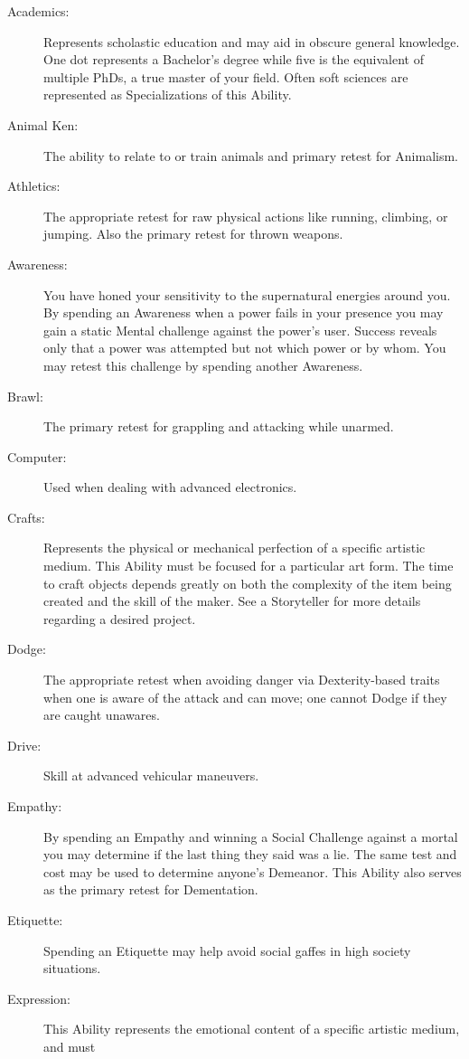 \begin{description}
	\item[Academics:]  Represents scholastic education and may aid in obscure general knowledge.  One dot 
	represents a Bachelor's degree while five is the equivalent of multiple PhDs, a true master of your field. 
	Often soft sciences are represented as Specializations of this Ability.
	\item[Animal Ken:]  The ability to relate to or train animals and primary retest for Animalism.
	\item[Athletics:]  The appropriate retest for raw physical actions like running, climbing, or jumping.  
	Also the primary retest for thrown weapons.
	\item[Awareness:]  You have honed your sensitivity to the supernatural energies around you.  By spending an 
	Awareness when a power fails in your presence you may gain a static Mental challenge against the power's user.  
	Success reveals only that a power was attempted but not which power or by whom.  You may retest this challenge by  
	spending another Awareness.
	\item[Brawl:]  The primary retest for grappling and attacking while unarmed.
	\item[Computer:]  Used when dealing with advanced electronics.
	\item[Crafts:]  Represents the physical or mechanical perfection of a specific artistic medium.  This Ability 
	must be focused for a particular art form. The time to craft objects depends greatly on both the complexity of 
	the item being created and the skill of the maker.  See a Storyteller for more details regarding a desired project.
	\item[Dodge:]  The appropriate retest when avoiding danger via Dexterity-based traits when one is aware of the attack and can move; one cannot Dodge if they are caught unawares.
	\item[Drive:]  Skill at advanced vehicular maneuvers.
	\item[Empathy:]  By spending an Empathy and winning a Social Challenge against a mortal you may determine if 
	the last thing they said was a lie.  The same test and cost may be used to determine anyone's Demeanor.  This 
	Ability also serves as the primary retest for Dementation.
	\item[Etiquette:]  Spending an Etiquette may help avoid social gaffes in high society situations.
	\item[Expression:]  This Ability represents the emotional content of a specific artistic medium, and must 

\end{description}
